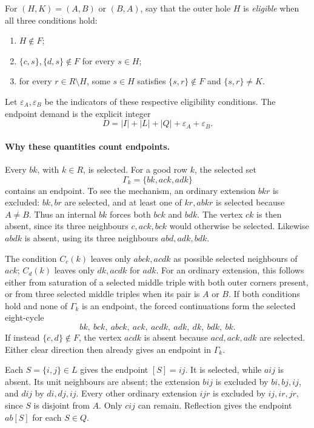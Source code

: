 \documentclass[11pt,a4paper]{article}
\theoremstyle{definition}
\theoremstyle{remark}
\begin{document}
For $(H,K)=(A,B)$ or $(B,A)$, say that the outer hole $H$ is
\emph{eligible} when all three conditions hold:
\begin{enumerate}
\item $H\notin F$;
\item $\{c,s\},\{d,s\}\notin F$ for every $s\in H$;
\item for every $r\in R\setminus H$, some $s\in H$ satisfies
      $\{s,r\}\notin F$ and $\{s,r\}\ne K$.
\end{enumerate}
Let $\varepsilon_A,\varepsilon_B$ be the indicators of these respective
eligibility conditions. The endpoint demand is the explicit integer
\begin{equation}\label{eq:ordinary-endpoint-demand}
 D=|I|+|L|+|Q|+\varepsilon_A+\varepsilon_B.
\end{equation}

\paragraph{Why these quantities count endpoints.}
Every $bk$, with $k\in R$, is selected. For a good row $k$, the selected
set
\[
 \Gamma_k=\{bk,ack,adk\}
\]
contains an endpoint. To see the mechanism, an ordinary extension $bkr$
is excluded: $bk,br$ are selected, and at least one of $kr,abkr$ is selected
because $A\ne B$. Thus an internal $bk$ forces both $bck$ and $bdk$.
The vertex $ck$ is then absent, since its three neighbours $c,ack,bck$
would otherwise be selected. Likewise $abdk$ is absent, using its three
neighbours $abd,adk,bdk$.

The condition $C_c(k)$ leaves only $abck,acdk$ as possible selected
neighbours of $ack$; $C_d(k)$ leaves only $dk,acdk$ for $adk$. For an
ordinary extension, this follows either from saturation of a selected
middle triple with both outer corners present, or from three selected
middle triples when its pair is $A$ or $B$. If both conditions hold and
none of $\Gamma_k$ is an endpoint, the forced continuations form the
selected eight-cycle
\[
 bk,\ bck,\ abck,\ ack,\ acdk,\ adk,\ dk,\ bdk,\ bk.
\]
If instead $\{c,d\}\notin F$, the vertex $acdk$ is absent because
$acd,ack,adk$ are selected. Either clear direction then already gives
an endpoint in $\Gamma_k$.

Each $S=\{i,j\}\in L$ gives the endpoint $[S]=ij$. It is selected, while
$aij$ is absent. Its unit neighbours are absent; the extension $bij$ is
excluded by $bi,bj,ij$, and $dij$ by $di,dj,ij$. Every other ordinary
extension $ijr$ is excluded by $ij,ir,jr$, since $S$ is disjoint from $A$.
Only $cij$ can remain. Reflection gives the endpoint $ab[S]$ for each
$S\in Q$.
\end{document}
